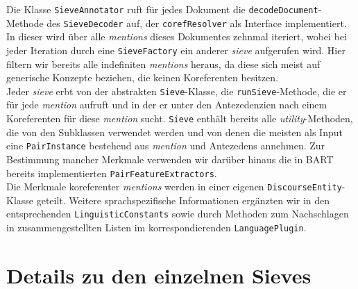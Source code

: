\documentclass{scrartcl}
\begin{document}
Die Klasse \texttt{SieveAnnotator} ruft für jedes Dokument die \texttt{decodeDocument}-Methode des \texttt{SieveDecoder} auf, der \texttt{corefResolver} als Interface implementiert. In dieser wird über alle \textit{mentions} dieses Dokumentes zehnmal iteriert, wobei bei jeder Iteration durch eine \texttt{SieveFactory} ein anderer \textit{sieve} aufgerufen wird. Hier filtern wir bereits alle indefiniten \textit{mentions} heraus, da diese sich meist auf generische Konzepte beziehen, die keinen Koreferenten besitzen.\\
Jeder \textit{sieve} erbt von der abstrakten \texttt{Sieve}-Klasse, die \texttt{runSieve}-Methode, die er für jede \textit{mention} aufruft und in der er unter den Antezedenzien nach einem Koreferenten für diese \textit{mention} sucht. \texttt{Sieve} enthält bereits alle \textit{utility}-Methoden, die von den Subklassen verwendet werden und von denen die meisten als Input eine \texttt{PairInstance} bestehend aus \textit{mention} und Antezedens annehmen. Zur Bestimmung mancher Merkmale verwenden wir darüber hinaus die in BART bereits implementierten \texttt{PairFeatureExtractors}.\\
Die Merkmale koreferenter \textit{mentions} werden in einer eigenen \texttt{DiscourseEntity}-Klasse geteilt. Weitere sprachspezifische Informationen ergänzten wir in den entsprechenden \texttt{LinguisticConstants} sowie durch Methoden zum Nachschlagen in zusammengestellten Listen im korrespondierenden \texttt{LanguagePlugin}.

\section{Details zu den einzelnen Sieves}
\end{document}
